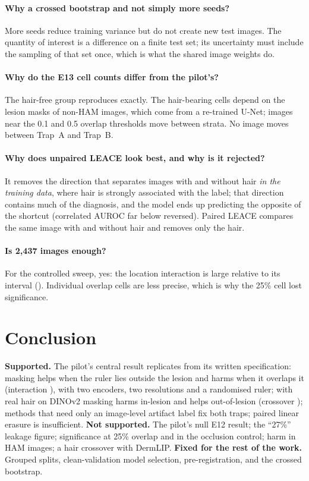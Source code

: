 \paragraph{Why a crossed bootstrap and not simply more seeds?} More seeds reduce training variance but do not create
new test images. The quantity of interest is a difference on a finite test set; its uncertainty must include the
sampling of that set once, which is what the shared image weights do.
\paragraph{Why do the E13 cell counts differ from the pilot's?} The hair-free group reproduces exactly. The
hair-bearing cells depend on the lesion masks of non-HAM images, which come from a re-trained U-Net; images near the
0.1 and 0.5 overlap thresholds move between strata. No image moves between Trap~A and Trap~B.
\paragraph{Why does unpaired LEACE look best, and why is it rejected?} It removes the direction that separates images
with and without hair \emph{in the training data}, where hair is strongly associated with the label; that direction
contains much of the diagnosis, and the model ends up predicting the opposite of the shortcut (correlated AUROC far
below reversed). Paired LEACE compares the same image with and without hair and removes only the hair.
\paragraph{Is 2,437 images enough?} For the controlled sweep, yes: the location interaction is large relative to its
interval (\sOneEOneInter). Individual overlap cells are less precise, which is why the 25\% cell lost significance.

\section{Conclusion}
\textbf{Supported.} The pilot's central result replicates from its written specification: masking helps when the
ruler lies outside the lesion and harms when it overlaps it (interaction \sOneEOneInter), with two encoders, two
resolutions and a randomised ruler; with real hair on DINOv2 masking harms in-lesion and helps out-of-lesion (crossover
\sOneXdino); methods that need only an image-level artifact label fix both traps; paired linear erasure is insufficient.
\textbf{Not supported.} The pilot's null E12 result; the ``27\%'' leakage figure; significance at 25\% overlap and in
the occlusion control; harm in HAM images; a hair crossover with DermLIP. \textbf{Fixed for the rest of the work.}
Grouped splits, clean-validation model selection, pre-registration, and the crossed bootstrap.


